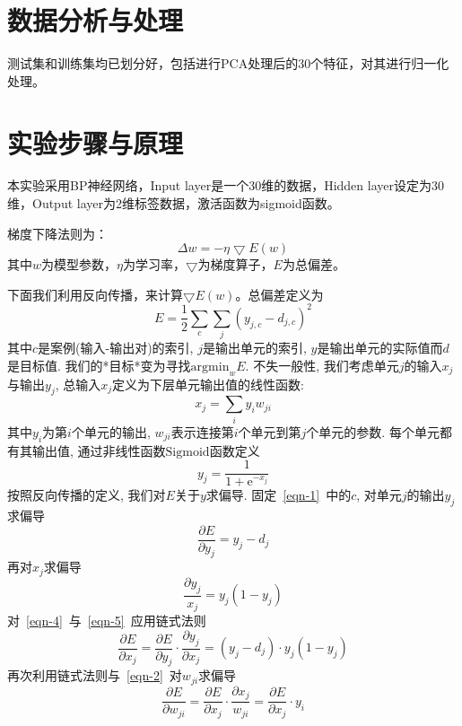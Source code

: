 \documentclass[a4paper,12pt]{report}
\begin{document}
\section{数据分析与处理}
\par 测试集和训练集均已划分好，包括进行PCA处理后的30个特征，对其进行归一化处理。
\section{实验步骤与原理}
\par 本实验采用BP神经网络，Input layer是一个30维的数据，Hidden layer设定为30维，Output layer为2维标签数据，激活函数为sigmoid函数。
\par 梯度下降法则为：
$$
\Delta w=-\eta \bigtriangledown E(w)
$$
其中$w$为模型参数，$\eta$为学习率，$\bigtriangledown$为梯度算子，$E$为总偏差。
\par 下面我们利用反向传播，来计算$\bigtriangledown E(w)$。总偏差定义为
\begin{equation}\label{eqn-1} 
  E=\frac{1}{2}\sum_{c}\sum_{j}(y_{j,c}-d_{j,c})^{2}
\end{equation}
其中$c$是案例(输入-输出对)的索引, $j$是输出单元的索引, $y$是输出单元的实际值而$d$是目标值. 我们的*目标*变为寻找$\mathrm{argmin}_{w}E$.
不失一般性, 我们考虑单元$j$的输入$x_{j}$与输出$y_{j}$, 总输入$x_{j}$定义为下层单元输出值的线性函数:
\begin{equation}\label{eqn-2} 
  x_{j}=\sum_{i}y_{i}w_{ji}
\end{equation}
其中$y_{i}$为第$i$个单元的输出, $w_{ji}$表示连接第$i$个单元到第$j$个单元的参数.
每个单元都有其输出值, 通过非线性函数$\mathrm{Sigmoid}$函数定义
\begin{equation}\label{eqn-3} 
  y_{j}=\frac{1}{1+\mathrm{e}^{-x_{j}}}
\end{equation}
按照反向传播的定义, 我们对$E$关于$y$求偏导. 固定~\ref{eqn-1}\ 中的$c$, 对单元$j$的输出$y_{j}$求偏导
\begin{equation}\label{eqn-4} 
  \frac{\partial E}{\partial y_{j}}=y_{j}-d_{j}
\end{equation}
再对$x_{j}$求偏导
\begin{equation}\label{eqn-5} 
  \frac{\partial y_{j}}{x_{j}}=y_{j}(1-y_{j})
\end{equation}
对~\ref{eqn-4}\ 与~\ref{eqn-5}\ 应用链式法则
\begin{equation}\label{eqn-6} 
  \frac{\partial E}{\partial x_{j}}=\frac{\partial E}{\partial y_{j}}\cdot\frac{\partial y_{j}}{\partial x_{j}}=(y_{j}-d_{j})\cdot y_{j}(1-y_{j})
\end{equation}
再次利用链式法则与~\ref{eqn-2}\ 对$w_{ji}$求偏导
\begin{equation}\label{eqn-7} 
  \frac{\partial E}{\partial w_{ji}}=\frac{\partial E}{\partial x_{j}}\cdot\frac{\partial x_{j}}{w_{ji}}=\frac{\partial E}{\partial x_{j}}\cdot y_{i}
\end{equation}
\end{document}
